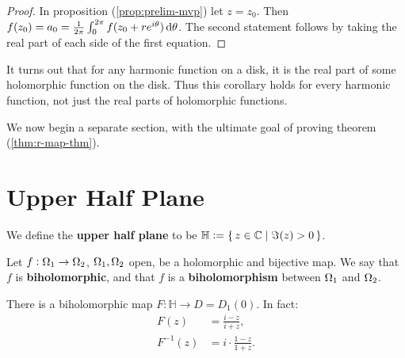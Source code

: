 \begin{proof}
In proposition (\ref{prop:prelim-mvp}) let $z=z_0$. Then $f(z_0) = a_0 = \frac{1}{2 \pi} \int_0^{2 \pi} f( z_0 + r e^{i \theta} ) \dif \theta$. The second statement follows by taking the real part of each side of the first equation.
\end{proof}

\begin{remark}
It turns out that for any harmonic function on a disk, it is the real part of some holomorphic function on the disk. Thus this corollary holds for every harmonic function, not just the real parts of holomorphic functions.
\end{remark}

We now begin a separate section, with the ultimate goal of proving theorem (\ref{thm:r-map-thm}).

\section{Upper Half Plane}

\begin{definition}
We define the \textbf{upper half plane} to be $\mathbb{H} \vcentcolon = \set{z \in \mathbb{C}\mid \Im (z) > 0}$.

\end{definition}


\begin{definition}[Biholomorphisms]
Let $f: \Omega_1 \to \Omega_2$, $\Omega_1, \Omega_2$ open, be a holomorphic and bijective map. We say that $f$ is \textbf{biholomorphic}, and that $f$ is a \textbf{biholomorphism} between $\Omega_1$ and $\Omega_2$.
\end{definition}

\begin{proposition}
There is a biholomorphic map $F: \mathbb{H} \to D = D_1 (0)$. In fact:
\begin{align*}
    F(z) &= \frac{i-z}{i+z},\\
    F^{-1}(z) &= i \cdot \frac{1-z}{1+z}.
\end{align*}
\end{proposition}

